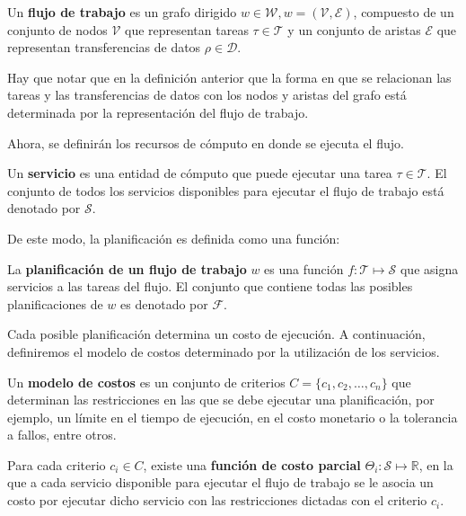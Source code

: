 \begin{defn}
Un \textbf{flujo de trabajo} es un grafo dirigido $w \in \mathcal{W}, w = (\mathcal{V},\mathcal{E})$, compuesto de un conjunto de nodos $\mathcal{V}$ que representan tareas $ \tau \in \mathcal{T}$ y un conjunto de aristas $\mathcal{E}$ que representan transferencias de datos $ \rho \in \mathcal{D}$.
\end{defn}

Hay que notar que en la definición anterior que la forma en que se relacionan las tareas y las transferencias de datos con los nodos y aristas del grafo está determinada por la representación del flujo de trabajo.

Ahora, se definirán los recursos de cómputo en donde se ejecuta el flujo. 

\begin{defn}
Un \textbf{servicio} es una entidad de cómputo que puede ejecutar una tarea $\tau \in \mathcal{T}$. El conjunto de todos los servicios disponibles para ejecutar el flujo de trabajo está denotado por $\mathcal{S}$.
\end{defn}

De este modo, la planificación es definida como una función:

\begin{defn}
La \textbf{planificación de un flujo de trabajo} $w$ es una función $ f: \mathcal{T} \mapsto \mathcal{S}$ que asigna servicios a las tareas del flujo. El conjunto que contiene todas las posibles planificaciones de $w$ es denotado por $\mathcal{F}$.
\end{defn}

Cada posible planificación determina un costo de ejecución. A continuación, definiremos el modelo de costos determinado por la utilización de los servicios.

\begin{defn}
Un \textbf{modelo de costos} es un conjunto de criterios $C = \{c_1, c_2, \dots, c_n\}$ que determinan las restricciones en las que se debe ejecutar una planificación, por ejemplo, un límite en el tiempo de ejecución, en el costo monetario o la tolerancia a fallos, entre otros.
\end{defn}

\begin{defn}
Para cada criterio $c_i \in C$, existe una \textbf{función de costo parcial} $\Theta_i : \mathcal{S} \mapsto \mathbb{R}$, en la que a cada servicio disponible para ejecutar el flujo de trabajo se le asocia un costo por ejecutar dicho servicio con las restricciones dictadas con el criterio $c_i$.
\end{defn}

